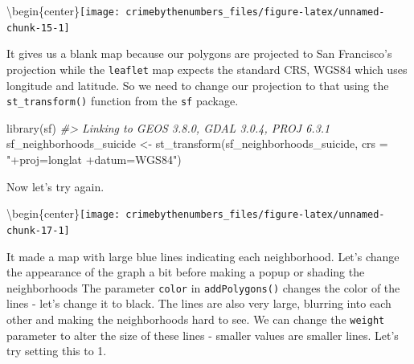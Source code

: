\documentclass[
  12pt,
]{book}
\newenvironment{Shaded}{\begin{snugshade}}{\end{snugshade}}
\newcommand{\AttributeTok}[1]{\textcolor[rgb]{0.61,0.61,0.61}{#1}}
\newcommand{\CommentTok}[1]{\textcolor[rgb]{0.37,0.37,0.37}{\textit{#1}}}
\newcommand{\FunctionTok}[1]{\textcolor[rgb]{0,0,0}{#1}}
\newcommand{\NormalTok}[1]{#1}
\newcommand{\OtherTok}[1]{\textcolor[rgb]{0.37,0.37,0.37}{#1}}
\newcommand{\SpecialCharTok}[1]{\textcolor[rgb]{0,0,0}{#1}}
\newcommand{\StringTok}[1]{\textcolor[rgb]{0.5,0.5,0.5}{#1}}
\begin{document}
\textbackslash begin\{center\}\texttt{[image: crimebythenumbers\_files/figure-latex/unnamed-chunk-15-1]}

It gives us a blank map because our polygons are projected to San Francisco's projection while the \texttt{leaflet} map expects the standard CRS, WGS84 which uses longitude and latitude. So we need to change our projection to that using the \texttt{st\_transform()} function from the \texttt{sf} package.

\begin{Shaded}
\begin{Highlighting}[]
\FunctionTok{library}\NormalTok{(sf)}
\CommentTok{\#\textgreater{} Linking to GEOS 3.8.0, GDAL 3.0.4, PROJ 6.3.1}
\NormalTok{sf\_neighborhoods\_suicide }\OtherTok{\textless{}{-}} \FunctionTok{st\_transform}\NormalTok{(sf\_neighborhoods\_suicide,}
                                        \AttributeTok{crs =} \StringTok{"+proj=longlat +datum=WGS84"}\NormalTok{)}
\end{Highlighting}
\end{Shaded}

Now let's try again.

\begin{Shaded}
\end{Shaded}

\textbackslash begin\{center\}\texttt{[image: crimebythenumbers\_files/figure-latex/unnamed-chunk-17-1]}

It made a map with large blue lines indicating each neighborhood. Let's change the appearance of the graph a bit before making a popup or shading the neighborhoods The parameter \texttt{color} in \texttt{addPolygons()} changes the color of the lines - let's change it to black. The lines are also very large, blurring into each other and making the neighborhoods hard to see. We can change the \texttt{weight} parameter to alter the size of these lines - smaller values are smaller lines. Let's try setting this to 1.
\end{document}

